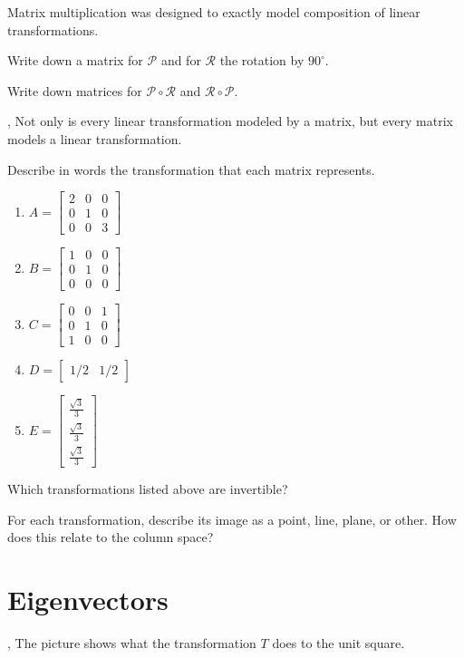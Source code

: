 \documentclass[letter]{article}
\newcommand{\mat}[1]{\begin{bmatrix}#1\end{bmatrix}}
\begin{document}
Matrix multiplication was designed to exactly model composition of linear transformations.
\begin{Enum}[resume]
	\item Write down a matrix for $\mathcal P$ and for $\mathcal R$ the rotation
		by $90^\circ$.
	\item Write down matrices for $\mathcal P\circ\mathcal R$ and $\mathcal R\circ \mathcal P$.
\end{Enum}

\sep
Not only is every linear transformation modeled by a matrix, but every matrix models a linear
transformation.

\begin{Enum}
	\item Describe in words the transformation that each matrix represents.
		\begin{enumerate}
			\item $A=\mat{2&0&0\\0&1&0\\0&0&3}$
			\item $B=\mat{1&0&0\\0&1&0\\0&0&0}$
			\item $C=\mat{0&0&1\\0&1&0\\1&0&0}$
			\item $D=\mat{1/2&1/2}$
			\item $E=\mat{\frac{\sqrt{3}}{3}\\\frac{\sqrt{3}}{3}\\\frac{\sqrt{3}}{3}}$
		\end{enumerate}
	\item Which transformations listed above are invertible?
	\item For each transformation, describe its image as a point, line,
		plane, or other.  How does this relate to the column space?
\end{Enum}

\newpage
\section*{Eigenvectors}
	\sep
	The picture shows what the transformation $T$ does to the unit square.
\end{document}
